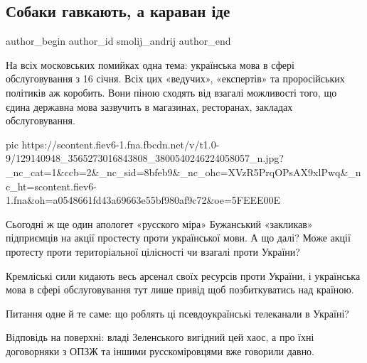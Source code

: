  
 
 
 
 
 
\subsection{Собаки гавкають, а караван іде}
\label{sec:02_12_2020.fb.smolij_andrij.1.mova_karavan_ide}
\ifcmt
	author_begin
   author_id smolij_andrij
	author_end
\fi

На всіх московських помийках одна тема: українська мова в сфері обслуговування
з 16 січня. Всіх цих «ведучих», «експертів» та проросійських політиків аж
коробить. Вони піною сходять від взагалі можливості того, що єдина державна
мова зазвучить в магазинах, ресторанах, закладах обслуговування.

\ifcmt
pic https://scontent.fiev6-1.fna.fbcdn.net/v/t1.0-9/129140948_3565273016843808_3800540246224058057_n.jpg?_nc_cat=1&ccb=2&_nc_sid=8bfeb9&_nc_ohc=XVzR5PrqOPsAX9xlPwq&_nc_ht=scontent.fiev6-1.fna&oh=a0548661fd43a69663e55bf980af9c72&oe=5FEEE00E
\fi

Сьогодні ж ще один апологет «русского міра» Бужанський «закликав» підприємців
на акції простесту проти української мови. А що далі? Може акції протесту проти
територіальної цілісності чи взагалі проти України? 

Кремліські сили кидають весь арсенал своїх ресурсів проти України, і українська
мова в сфері обслуговування тут лише привід щоб позбиткуватись над країною.

Питання одне й те саме: що роблять ці псевдоукраїнські телеканали в Україні? 

Відповідь на поверхні: владі Зеленського вигідний цей хаос, а про їхні
договорняки з ОПЗЖ та іншими русскоміровцями вже говорили давно.


